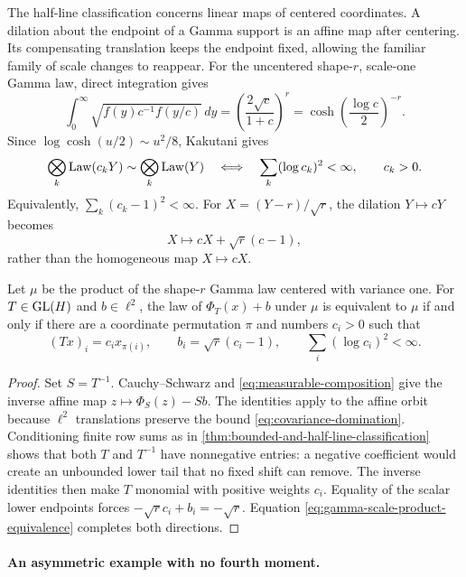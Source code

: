 The half-line classification concerns linear maps of centered coordinates.
A dilation about the endpoint of a Gamma support is an affine map after
centering. Its compensating translation keeps the endpoint fixed, allowing
the familiar family of scale changes to reappear.
For the uncentered shape-\(r\), scale-one Gamma law, direct integration
gives
\[
  \int_0^\infty\sqrt{f(y)c^{-1}f(y/c)}\,dy
 =\left(\frac{2\sqrt c}{1+c}\right)^{r}
 =\cosh\!\left(\frac{\log c}{2}\right)^{-r}.
\]
Since \(\log\cosh(u/2)\sim u^2/8\), Kakutani gives
\begin{equation}
 \bigotimes_k\operatorname{Law}(c_kY)\sim\bigotimes_k\operatorname{Law}(Y)
 \quad\Longleftrightarrow\quad
 \sum_k(\log c_k)^2<\infty,
 \qquad c_k>0.
 \label{eq:gamma-scale-product-equivalence}
\end{equation}
Equivalently, \(\sum_k(c_k-1)^2<\infty\).  For
\(X=(Y-r)/\sqrt{r}\), the dilation \(Y\mapsto cY\) becomes
\[
 X\longmapsto cX+\sqrt{r}(c-1),
\]
rather than the homogeneous map \(X\mapsto cX\).

\begin{corollary}
Let \(\mu\) be the product of the shape-\(r\) Gamma law centered with
variance one.
For \(T\in\operatorname{GL}(H)\) and \(b\in\ell^2\), the law of
\(\Phi_T(x)+b\) under \(\mu\) is equivalent to \(\mu\) if and only if
there are a coordinate
permutation \(\pi\) and numbers \(c_i>0\) such that
\[
 (Tx)_i=c_ix_{\pi(i)},\qquad
 b_i=\sqrt{r}(c_i-1),\qquad
 \sum_i(\log c_i)^2<\infty.
\]
\end{corollary}
\begin{proof}
Set \(S=T^{-1}\). Cauchy--Schwarz and
\eqref{eq:measurable-composition} give the inverse affine map
\(z\mapsto\Phi_S(z)-Sb\). The identities apply to the affine orbit
because \(\ell^2\) translations preserve the bound
\eqref{eq:covariance-domination}. Conditioning finite row sums as in
\cref{thm:bounded-and-half-line-classification} shows that both \(T\) and
\(T^{-1}\) have nonnegative entries: a negative coefficient would create an
unbounded lower tail that no fixed shift can remove.  The inverse identities
then make \(T\) monomial with positive weights \(c_i\).  Equality of the
scalar lower endpoints forces
\(-\sqrt{r}c_i+b_i=-\sqrt{r}\).
Equation \eqref{eq:gamma-scale-product-equivalence} completes both directions.
\end{proof}

\paragraph{An asymmetric example with no fourth moment.}

